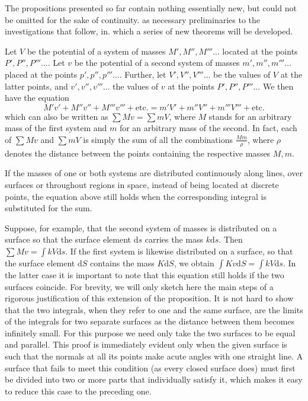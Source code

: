 %
The propositions presented so far contain nothing essentially new, but could not be omitted for the sake of continuity. as necessary preliminaries to the investigations that follow, in. which a series of new theorems will be developed.

Let $V$ be the potential of a system of masses $M',M'',M'''\ldots$ located at the points $P',P'',P'''\ldots$. Let $v$ be the potential of a second system of masses $m',m'',m'''\ldots$ placed at the points $p',p'',p'''\ldots$. Further, let $V',V'',V'''\ldots$ be the values of $V$ at the latter points, and $v',v'',v'''\ldots$ the values of $v$ at the points $P',P'',P'''\ldots$ We then have the equation
\[
M'v'+M''v''+M'''v'''+\text{etc.}=m'V'+m''V''+m'''V'''+\text{etc.}
\]
which can also be written as $\sum Mv=\sum mV$, where $M$ stands for an arbitrary mass of the first system and $m$ for an arbitrary mass of the second. In fact, each of $\sum Mv$ and $\sum mV$ is simply the sum of all the combinations $\frac{Mm}{\rho}$, where $\rho$ denotes the distance between the points containing the respective masses $M,m$.

If the masses of one or both systems are distributed continuously along lines, over surfaces or throughout regions in space, instead of being located at discrete points, the equation above still holds when the corresponding integral is substituted for the sum.

Suppose, for example, that the second system of masses is distributed on a surface so that the surface element $\mathrm ds$ carries the mass $k\mathrm ds$. Then $\sum Mv=\int kV\mathrm ds$. If the first system is likewise distributed on a surface, so that the surface element $\mathrm dS$ contains the mass $K\mathrm dS$, we obtain $\int Kv\mathrm dS=\int kV\mathrm ds$. In the latter case it is important to note that this equation still holds if the two surfaces coincide. For brevity, we will only sketch here the main steps of a rigorous justification of this extension of the proposition. It is not hard to show that the two integrals, when they refer to one and the same surface, are the limits of the integrals for two separate surfaces
%
as the distance between them becomes infinitely small. For this purpose we need only take the two surfaces to be equal and parallel. This proof is immediately evident only when the given surface is such that the normals at all its points make acute angles with one straight line. A surface that fails to meet this condition (as every closed surface does) must first be divided into two or more parts that individually satisfy it, which makes it easy to reduce this case to the preceding one.

